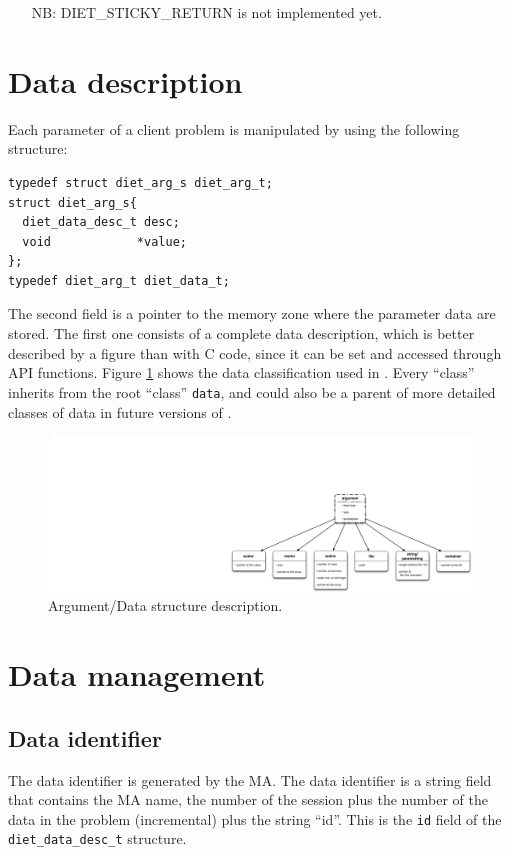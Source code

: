 \begin{itemize}
\item[NB:] \textsf{DIET\_STICKY\_RETURN} is not implemented yet.
\end{itemize}

\section{Data description}
\label{sec:datadesc}

Each parameter of a client problem is manipulated by \diet using the following
structure:
{\footnotesize
\begin{verbatim}
typedef struct diet_arg_s diet_arg_t;
struct diet_arg_s{
  diet_data_desc_t desc;
  void            *value;
};
typedef diet_arg_t diet_data_t;
\end{verbatim}
}

The second field is a pointer to the memory zone where the parameter
data are stored. The first one consists of a complete \diet data
description, which is better described by a figure than with C code,
since it can be set and accessed through API functions. Figure
\ref{fig:data} shows the data classification used in \diet. Every
``class'' inherits from the root ``class'' \texttt{data}, and could
also be a parent of more detailed classes of data in future versions
of \diet.

\begin{figure}[hpt]
 \begin{center}
  \includegraphics[scale=.5]{fig/data}
  \caption{Argument/Data structure description.}
  \label{fig:data}
 \end{center}
\end{figure}


\section{Data management}
\label{sec:datamgt}

\subsection{Data identifier}
\label{ssec:dataid}
The data identifier is generated by the MA. The data identifier is a
string field that contains the MA name, the number of the session plus
the number of the data in the problem (incremental) plus the string
``id''.  This is the \texttt{id} field of the
\texttt{diet\_data\_desc\_t} structure.

